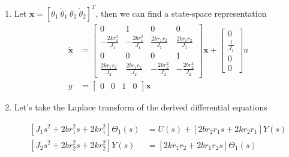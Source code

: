 \documentclass[twoside]{article}
\theoremstyle{definition}
\begin{document}
\begin{enumerate}
	\item Let $\mathbf{x} = \left[ \theta_1 \ \dot{\theta}_1 \
            \theta_2 \ \dot{\theta}_2 \right]^T$, then we can find a
          state-space representation
%
\begin{align*}
\dot{\mathbf{x}} &= \left[ \begin{array}{cccc} 0 & 1 & 0 & 0 \\
-\frac{2 k r_1^2}{J_1} & -\frac{2 b r_1^2}{J_1} & \frac{2 k r_1 r_2}{J_1} &
\frac{2 b r_1 r_2}{J_1}
\\
0 & 0 & 0 & 1 \\
\frac{2 k r_1 r_2}{J_2} & \frac{2 b r_1 r_2}{J_2} & -\frac{2 k r_2^2}{J_2} &
-\frac{2 b r_2^2}{J_2}
\end{array} \right] \mathbf{x} +
                   \left[ \begin{array}{c} 0 \\ \frac{1}{J_1} \\ 0 \\
                            0 \end{array} \right] u
\\
y &= \left[ \begin{array}{cccc} 0 & 0 & 1 & 0 \end{array} \right] \mathbf{x} 
\end{align*}

	\item Let's take the Laplace transform of the derived
          differential equations

\begin{align*}
\left[  J_1 s^2 + 2 b r_1^2 s + 2 k r_1^2 \right] \Theta_1(s) &= U(s)
                                                                +
\left[ 2 b r_2 r_1 s + 2 k r_2 r_1 \right] Y(s)
\\
\left[  J_2 s^2 + 2 b r_2^2 s + 2 k r_2^2 \right] Y(s) &= 
\left[ 2 k r_1 r_2 + 2 b r_1 r_2 s \right] \Theta_1(s)
\end{align*}


\end{enumerate}
\end{document}
